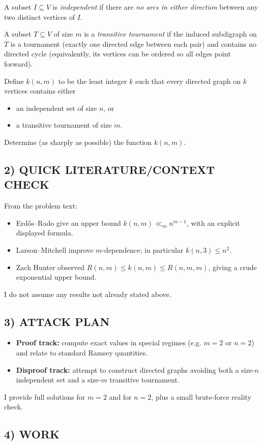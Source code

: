 A subset $I\subseteq V$ is \emph{independent} if there are \emph{no arcs in either direction} between any two distinct vertices of $I$.

A subset $T\subseteq V$ of size $m$ is a \emph{transitive tournament} if the induced subdigraph on $T$ is a tournament (exactly one directed edge between each pair) and contains no directed cycle (equivalently, its vertices can be ordered so all edges point forward).

Define $k(n,m)$ to be the least integer $k$ such that every directed graph on $k$ vertices contains either
\begin{itemize}
\item an independent set of size $n$, or
\item a transitive tournament of size $m$.
\end{itemize}
Determine (as sharply as possible) the function $k(n,m)$.

\subsection*{2) QUICK LITERATURE/CONTEXT CHECK}
From the problem text:
\begin{itemize}
\item Erd\H{o}s--Rado give an upper bound $k(n,m)\ll_m n^{m-1}$, with an explicit displayed formula.
\item Larson--Mitchell improve $m$-dependence; in particular $k(n,3)\le n^2$.
\item Zach Hunter observed $R(n,m)\le k(n,m)\le R(n,m,m)$, giving a crude exponential upper bound.
\end{itemize}
I do not assume any results not already stated above.

\subsection*{3) ATTACK PLAN}
\begin{itemize}
\item \textbf{Proof track:} compute exact values in special regimes (e.g. $m=2$ or $n=2$) and relate to standard Ramsey quantities.
\item \textbf{Disproof track:} attempt to construct directed graphs avoiding both a size-$n$ independent set and a size-$m$ transitive tournament.
\end{itemize}
I provide full solutions for $m=2$ and for $n=2$, plus a small brute-force reality check.

\subsection*{4) WORK}
